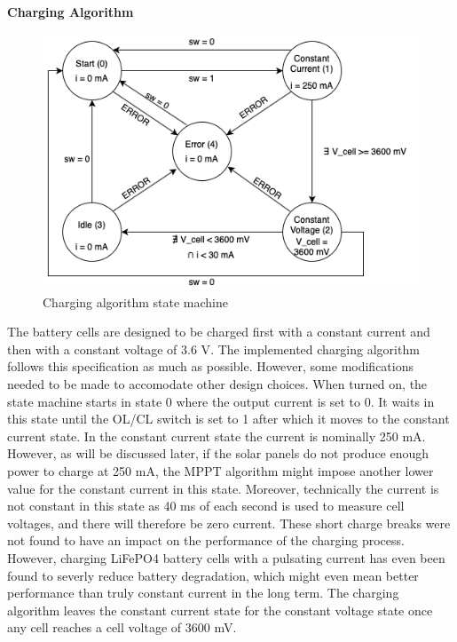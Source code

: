 \documentclass[a4paper]{article}
\begin{document}
\textbf{Charging Algorithm}
\begin{figure}[H]
	\begin{Center}
		\includegraphics[scale=0.5]{State_diagram.png}
		\caption{Charging algorithm state machine}
	\end{Center}
\end{figure}
\vspace{-20pt}
The battery cells are designed to be charged first with a constant current and then
with a constant voltage of 3.6 V\cite{batteryDatasheet}.
The implemented charging algorithm follows this specification as much as possible. 
However, some modifications needed to be made to accomodate other design choices.
When turned on, the state machine starts in state 0 where the output current is set
to 0. It waits in this state until the OL/CL switch is set to 1 after which it moves 
to the constant current state. In the constant current state the current is nominally 
250 mA. However, as will be discussed later, if the solar panels do not produce enough
power to charge at 250 mA, the MPPT algorithm might impose another lower value for 
the constant current in this state. Moreover, technically the current is not constant
in this state as 40 ms of each second is used to measure cell voltages, and there will 
therefore be zero current. These short charge breaks were not found to have an impact 
on the performance of the charging process. However, charging LiFePO4 battery cells with a
pulsating current has even been found to severly reduce battery degradation\cite{PulseCharging},
which might even mean better performance than truly constant current in the long term. The
charging algorithm leaves the constant current state for the constant voltage state
once any cell reaches a cell voltage of 3600 mV.
\end{document}
